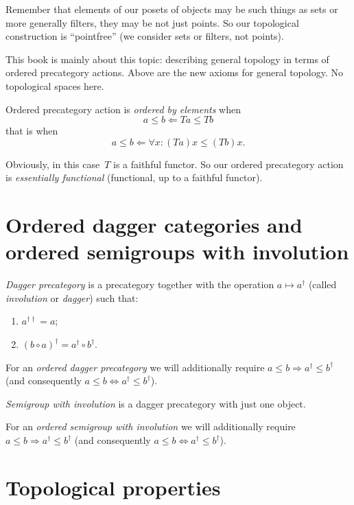 Remember that elements of our posets of objects may be such things as sets or more generally filters, they may be not just points. So our topological construction is ``pointfree'' (we consider sets or filters, not points).

This book is mainly about this topic: describing general topology in terms of ordered precategory actions. Above are the new axioms for general topology. No topological spaces here.

Ordered precategory action is \emph{ordered by elements} when \[ a\leq b \Leftarrow Ta\leq Tb \] that is when \[ a\leq b \Leftarrow \forall x:(Ta)x\leq(Tb)x. \]

Obviously, in this case~$T$ is a faithful functor. So our ordered precategory action is \emph{essentially functional} (functional, up to a faithful functor).

\chapter{Ordered dagger categories and ordered semigroups with involution}

\begin{defn}
\emph{Dagger precategory} is a precategory together with the operation $a\mapsto a^{\dagger}$ (called \emph{involution} or \emph{dagger}) such that:
\begin{enumerate}
\item $a^{\dagger\dagger} = a$;
\item $(b\circ a)^{\dagger} = a^{\dagger}\circ b^{\dagger}$.
\end{enumerate}
\end{defn}

For an \emph{ordered dagger precategory} we will additionally require $a\leq b\Rightarrow a^{\dagger}\leq b^{\dagger}$ (and consequently $a\leq b\Leftrightarrow a^{\dagger}\leq b^{\dagger}$).

\begin{defn}
\emph{Semigroup with involution} is a dagger precategory with just one object.
\end{defn}

For an \emph{ordered semigroup with involution} we will additionally require $a\leq b\Rightarrow a^{\dagger}\leq b^{\dagger}$ (and consequently $a\leq b\Leftrightarrow a^{\dagger}\leq b^{\dagger}$).

\chapter{Topological properties}

